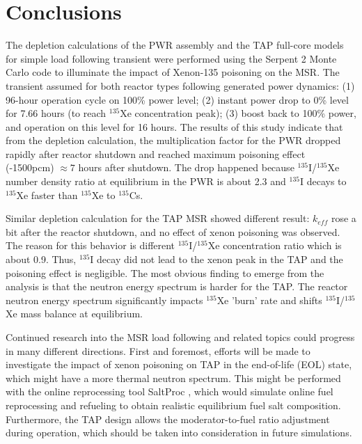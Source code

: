 \documentclass{anstrans}
\begin{document}
\section{Conclusions}
The depletion calculations of the \gls{PWR} assembly and the \gls{TAP} 
full-core models for simple load following transient were performed using the 
Serpent 2 Monte Carlo code to illuminate the impact of Xenon-135 poisoning on 
the \gls{MSR}. The transient assumed for both reactor types following 
generated power dynamics: 
(1) 96-hour operation cycle on 100\% power level; (2) instant power drop to 
0\% level for 7.66 hours (to reach $^{135}$Xe concentration peak); (3) boost 
back to 100\% power, and operation on this level for 16 hours. The results of 
this study indicate that from the depletion calculation, the multiplication 
factor for the \gls{PWR} dropped rapidly after reactor shutdown and reached 
maximum poisoning effect (-1500pcm) $\approx7$ hours after shutdown. The drop  
happened because $^{135}$I/$^{135}$Xe number density ratio at equilibrium in 
the \gls{PWR} is about 2.3 and $^{135}$I decays to $^{135}$Xe faster than 
$^{135}$Xe to $^{135}$Cs.

Similar depletion calculation for the \gls{TAP} \gls{MSR} showed different 
result: $k_{eff}$ rose a bit after the reactor shutdown, and no effect of xenon 
poisoning was observed. The reason for this behavior is different 
$^{135}$I/$^{135}$Xe concentration ratio which is about 0.9. Thus, $^{135}$I 
decay did not lead to the xenon peak in the \gls{TAP} and the poisoning effect 
is negligible. The most obvious finding to emerge from the analysis is that the 
neutron energy spectrum is harder for the \gls{TAP}. The reactor neutron energy
spectrum significantly impacts $^{135}$Xe 'burn' rate and shifts  
$^{135}$I/$^{135}$Xe mass balance at equilibrium.

Continued research into the \gls{MSR} load following and related topics 
could progress in many different directions. First and foremost, efforts will 
be made to investigate the impact of xenon poisoning on \gls{TAP} in the 
end-of-life (EOL) state, which might have a more thermal neutron spectrum. 
This 
might be performed with the online reprocessing tool SaltProc 
\cite{rykhlevskii_modeling_2019,rykhlevskii_arfc/saltproc:_2018}, which would  
simulate online fuel reprocessing and refueling to obtain realistic 
equilibrium fuel salt composition. Furthermore, the \gls{TAP} design allows 
the moderator-to-fuel ratio adjustment during operation, which should be taken 
into consideration in future simulations.
\end{document}
